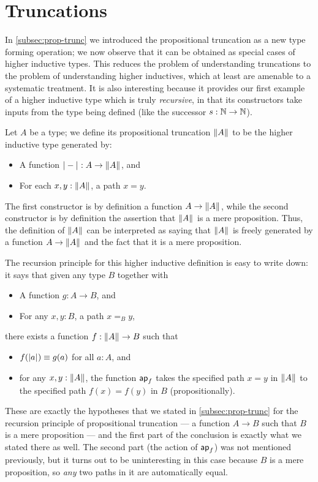 \section{Truncations}
\label{sec:hittruncations}

In \autoref{subsec:prop-trunc} we introduced the propositional truncation as a new type forming operation;
we now observe that it can be obtained as special cases of higher inductive types.
This reduces the problem of understanding truncations to the problem of understanding higher inductives, which at least are amenable to a systematic treatment.
It is also interesting because it provides our first example of a higher inductive type which is truly \emph{recursive}, in that its constructors take inputs from the type being defined (like the successor $s:\mathbb{N}\to\mathbb{N}$).

Let $A$ be a type; we define its propositional truncation $\Vert A\Vert_{}$ to be the higher inductive type generated by:
\begin{itemize}
\item A function $|-|_{} : A \to \Vert A\Vert_{}$, and
\item For each $x,y:\Vert A\Vert_{}$, a path $x=y$.
\end{itemize}
The first constructor is by definition a function $A\to \Vert A\Vert_{}$, while the second constructor is by definition the assertion that $\Vert A\Vert_{}$ is a mere proposition.
Thus, the definition of $\Vert A\Vert_{}$ can be interpreted as saying that $\Vert A\Vert_{}$ is freely generated by a function $A\to\Vert A\Vert_{}$ and the fact that it is a mere proposition.

The recursion principle for this higher inductive definition is easy to write down: it says that given any type $B$ together with
\begin{itemize}
\item A function $g:A\to B$, and
\item For any $x,y:B$, a path $x=_B y$,
\end{itemize}
there exists a function $f:\Vert A\Vert_{} \to B$ such that
\begin{itemize}
\item $f(|a|_{}) \equiv g(a)$ for all $a:A$, and
\item for any $x,y:\Vert A\Vert_{}$, the function $\mathsf{ap}_{f}$ takes the specified path $x=y$ in $\Vert A\Vert_{}$ to the specified path $f(x) = f(y)$ in $B$ (propositionally).
\end{itemize}
These are exactly the hypotheses that we stated in \autoref{subsec:prop-trunc} for the recursion principle of propositional truncation --- a function $A\to B$ such that $B$ is a mere proposition --- and the first part of the conclusion is exactly what we stated there as well.
The second part (the action of $\mathsf{ap}_{f}$) was not mentioned previously, but it turns out to be uninteresting in this case because $B$ is a mere proposition, so \emph{any} two paths in it are automatically equal.

